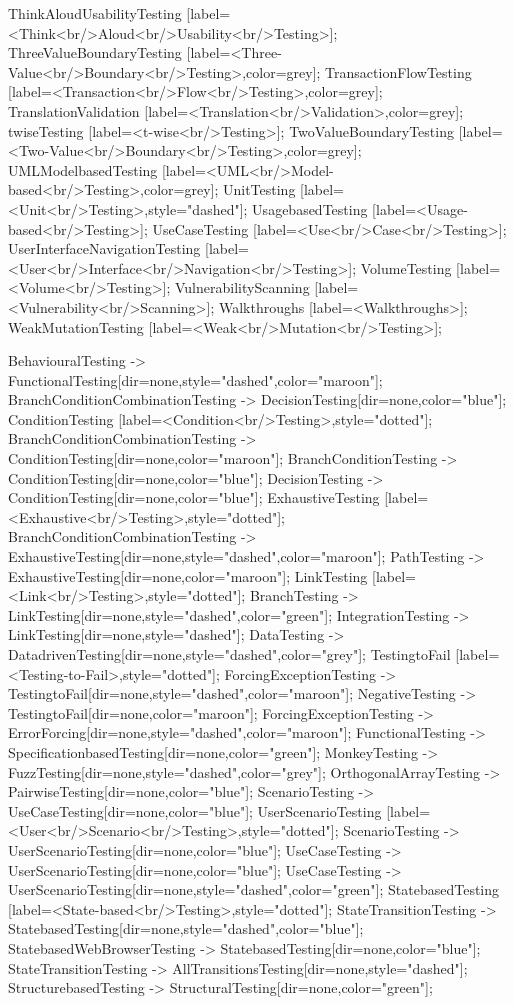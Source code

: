 \documentclass{article}
\begin{document}
{ThinkAloudUsabilityTesting [label=<Think<br/>Aloud<br/>Usability<br/>Testing>];
ThreeValueBoundaryTesting [label=<Three-Value<br/>Boundary<br/>Testing>,color=grey];
TransactionFlowTesting [label=<Transaction<br/>Flow<br/>Testing>,color=grey];
TranslationValidation [label=<Translation<br/>Validation>,color=grey];
twiseTesting [label=<t-wise<br/>Testing>];
TwoValueBoundaryTesting [label=<Two-Value<br/>Boundary<br/>Testing>,color=grey];
UMLModelbasedTesting [label=<UML<br/>Model-based<br/>Testing>,color=grey];
UnitTesting [label=<Unit<br/>Testing>,style="dashed"];
UsagebasedTesting [label=<Usage-based<br/>Testing>];
UseCaseTesting [label=<Use<br/>Case<br/>Testing>];
UserInterfaceNavigationTesting [label=<User<br/>Interface<br/>Navigation<br/>Testing>];
VolumeTesting [label=<Volume<br/>Testing>];
VulnerabilityScanning [label=<Vulnerability<br/>Scanning>];
Walkthroughs [label=<Walkthroughs>];
WeakMutationTesting [label=<Weak<br/>Mutation<br/>Testing>];

BehaviouralTesting -> FunctionalTesting[dir=none,style="dashed",color="maroon"];
BranchConditionCombinationTesting -> DecisionTesting[dir=none,color="blue"];
ConditionTesting [label=<Condition<br/>Testing>,style="dotted"];
BranchConditionCombinationTesting -> ConditionTesting[dir=none,color="maroon"];
BranchConditionTesting -> ConditionTesting[dir=none,color="blue"];
DecisionTesting -> ConditionTesting[dir=none,color="blue"];
ExhaustiveTesting [label=<Exhaustive<br/>Testing>,style="dotted"];
BranchConditionCombinationTesting -> ExhaustiveTesting[dir=none,style="dashed",color="maroon"];
PathTesting -> ExhaustiveTesting[dir=none,color="maroon"];
LinkTesting [label=<Link<br/>Testing>,style="dotted"];
BranchTesting -> LinkTesting[dir=none,style="dashed",color="green"];
IntegrationTesting -> LinkTesting[dir=none,style="dashed"];
DataTesting -> DatadrivenTesting[dir=none,style="dashed",color="grey"];
TestingtoFail [label=<Testing-to-Fail>,style="dotted"];
ForcingExceptionTesting -> TestingtoFail[dir=none,style="dashed",color="maroon"];
NegativeTesting -> TestingtoFail[dir=none,color="maroon"];
ForcingExceptionTesting -> ErrorForcing[dir=none,style="dashed",color="maroon"];
FunctionalTesting -> SpecificationbasedTesting[dir=none,color="green"];
MonkeyTesting -> FuzzTesting[dir=none,style="dashed",color="grey"];
OrthogonalArrayTesting -> PairwiseTesting[dir=none,color="blue"];
ScenarioTesting -> UseCaseTesting[dir=none,color="blue"];
UserScenarioTesting [label=<User<br/>Scenario<br/>Testing>,style="dotted"];
ScenarioTesting -> UserScenarioTesting[dir=none,color="blue"];
UseCaseTesting -> UserScenarioTesting[dir=none,color="blue"];
UseCaseTesting -> UserScenarioTesting[dir=none,style="dashed",color="green"];
StatebasedTesting [label=<State-based<br/>Testing>,style="dotted"];
StateTransitionTesting -> StatebasedTesting[dir=none,style="dashed",color="blue"];
StatebasedWebBrowserTesting -> StatebasedTesting[dir=none,color="blue"];
StateTransitionTesting -> AllTransitionsTesting[dir=none,style="dashed"];
StructurebasedTesting -> StructuralTesting[dir=none,color="green"];

}
\end{document}
